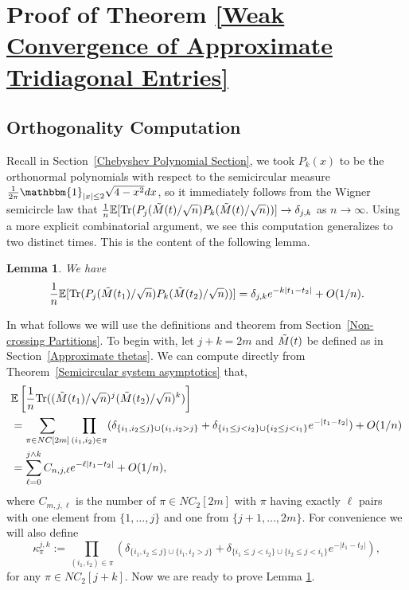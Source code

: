 \documentclass{amsart}
\newtheorem{lm}[thm]{Lemma}
\numberwithin{equation}{section}
\newcommand{\E}{\mathbb{E}}
\begin{document}
\section{Proof of Theorem \ref{Weak Convergence of Approximate Tridiagonal Entries}}\label{Moment Method Section}

\subsection{Orthogonality Computation}

Recall in Section~\ref{Chebyshev Polynomial Section}, we took $P_k(x)$ to be the orthonormal polynomials with respect to the semicircular measure $\frac{1}{2\pi}\mathbbm{1}_{|x|\leq 2} \sqrt{4-x^2} dx$, so it immediately follows from the Wigner semicircle law that $\frac{1}{n}\E[\mathrm{Tr}(P_j(\Tilde{M}(t)/\sqrt{n})P_k(\Tilde{M}(t)/\sqrt{n}))]\to \delta_{j,k}$ as $n \to \infty$. Using a more explicit combinatorial argument, we see this computation generalizes to two distinct times. This is the content of the following lemma.

\begin{lm}\label{Semicircular Cov}
We have
\begin{equation*}
    \frac{1}{n}\E[\mathrm{Tr}(P_j(\Tilde{M}(t_1)/\sqrt{n})P_k(\Tilde{M}(t_2)/\sqrt{n}))]=\delta_{j,k} e^{-k|t_1-t_2|}+O(1/n).
\end{equation*}
\end{lm}

In what follows we will use the definitions and theorem from Section~\ref{Non-crossing Partitions}. To begin with, let $j+k=2m$ and $\Tilde{M}(t)$ be defined as in Section~\ref{Approximate thetas}. We can compute directly from Theorem~\ref{Semicircular system asymptotics} that,
\begin{equation*}
    \begin{split}
        &\E\left[\frac{1}{n}\mathrm{Tr}((\Tilde{M}(t_1)/\sqrt{n})^j(\Tilde{M}(t_2)/\sqrt{n})^k)\right]\\
        &=\sum_{\pi \in NC[2m]} \prod_{(i_1,i_2) \in \pi} (\delta_{\{i_1,i_2 \leq j\} \cup \{i_1,i_2 > j\}}+\delta_{\{i_1 \leq j < i_2\} \cup \{i_2 \leq j < i_1\}} e^{-|t_1-t_2|})+O(1/n)\\
        &= \sum_{\ell=0}^{j \wedge k} C_{n,j,\ell}e^{-\ell |t_1-t_2|}+O(1/n),
    \end{split}
\end{equation*}
where $C_{m,j,\ell}$ is the number of $\pi\in NC_2[2m]$ with $\pi$ having exactly $\ell$ pairs with one element from $\{1, \dots, j\}$ and one from $\{j+1, \dots, 2m\}$. For convenience we will also define
\begin{equation}
    \kappa^{j,k}_{\pi}:=\prod_{(i_1,i_2) \in \pi} (\delta_{\{i_1,i_2 \leq j\} \cup \{i_1,i_2 > j\}}+\delta_{\{i_1 \leq j < i_2\} \cup \{i_2 \leq j < i_1\}} e^{-|t_1-t_2|}),
\end{equation}
for any $\pi \in NC_2[j+k]$. Now we are ready to prove Lemma \ref{Semicircular Cov}.
\end{document}
